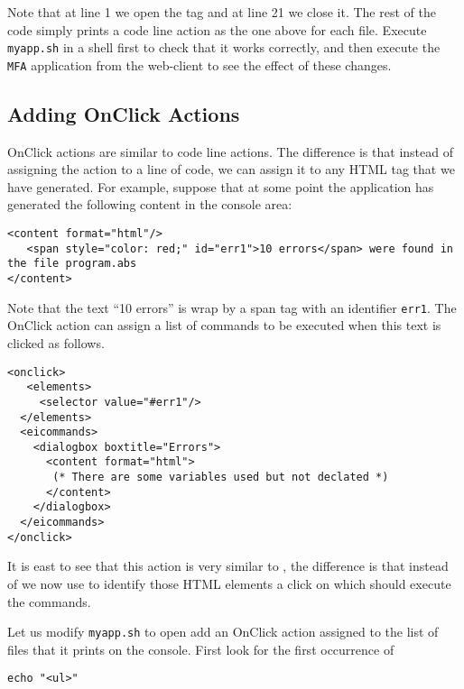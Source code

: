 \medskip
\noindent
Note that at line 1 we open the tag  and at line 21 we
close it. The rest of the code simply prints a code line action as the
one above for each file.
%
Execute \texttt{myapp.sh} in a shell first to check that it works
correctly, and then execute the \texttt{MFA} application from the
web-client to see the effect of these changes.

\subsection{Adding OnClick Actions}

OnClick actions are similar to code line actions. The difference is
that instead of assigning the action to a line of code, we can assign
it to any HTML tag that we have generated.
%
For example, suppose that at some point the application has generated
the following content in the console area:

\medskip
\begin{lstlisting}
<content format="html"/>
   <span style="color: red;" id="err1">10 errors</span> were found in the file program.abs
</content>
\end{lstlisting}

\medskip
\noindent
Note that the text ``10 errors'' is wrap by a span tag with an
identifier \texttt{err1}. The OnClick action can assign a list of
commands to be executed when this text is clicked as follows.

\begin{lstlisting}
<onclick>
   <elements>
     <selector value="#err1"/>
  </elements>
  <eicommands>
    <dialogbox boxtitle="Errors"> 
      <content format="html">
       (* There are some variables used but not declated *)
      </content>
    </dialogbox>
  </eicommands>
</onclick>
\end{lstlisting}

\medskip
\noindent
It is east to see that this action is very similar to
, the difference is that instead of  we
now use  to identify those HTML elements a click on
which should execute the commands. 

Let us modify \texttt{myapp.sh} to open add an OnClick action assigned
to the list of files that it prints on the console. First look for the
first occurrence of 

\medskip
\begin{lstlisting}[style=script]
echo "<ul>"
\end{lstlisting}

